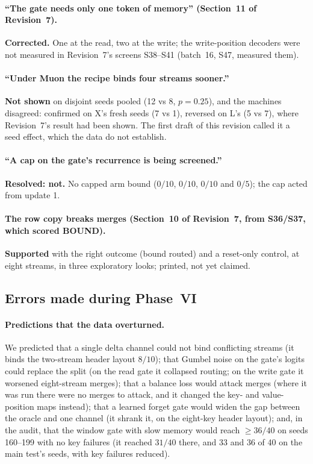 \documentclass[11pt]{article}
\begin{document}
\paragraph{``The gate needs only one token of memory'' (Section~11 of Revision~7).} \textbf{Corrected.} One at the read, two at the write; the write-position decoders were not measured in Revision~7's screens S38--S41 (batch~16, S47, measured them).

\paragraph{``Under Muon the recipe binds four streams sooner.''} \textbf{Not shown} on disjoint seeds pooled (12 vs 8, $p = 0.25$), and the machines disagreed: confirmed on X's fresh seeds (7 vs 1), reversed on L's (5 vs 7), where Revision~7's result had been shown. The first draft of this revision called it a seed effect, which the data do not establish.

\paragraph{``A cap on the gate's recurrence is being screened.''} \textbf{Resolved: not.} No capped arm bound ($0/10$, $0/10$, $0/10$ and $0/5$); the cap acted from update 1.

\paragraph{The row copy breaks merges (Section~10 of Revision~7, from S36/S37, which scored BOUND).} \textbf{Supported} with the right outcome (bound routed) and a reset-only control, at eight streams, in three exploratory looks; printed, not yet claimed.

\subsection{Errors made during Phase~VI}
\label{sec:errors}

\paragraph{Predictions that the data overturned.} We predicted that a single delta channel could not bind conflicting streams (it binds the two-stream header layout $8/10$); that Gumbel noise on the gate's logits could replace the split (on the read gate it collapsed routing; on the write gate it worsened eight-stream merges); that a balance loss would attack merges (where it was run there were no merges to attack, and it changed the key- and value-position maps instead); that a learned forget gate would widen the gap between the oracle and one channel (it shrank it, on the eight-key header layout); and, in the audit, that the window gate with slow memory would reach $\geq 36/40$ on seeds 160--199 with no key failures (it reached $31/40$ there, and $33$ and $36$ of 40 on the main test's seeds, with key failures reduced).
\end{document}
